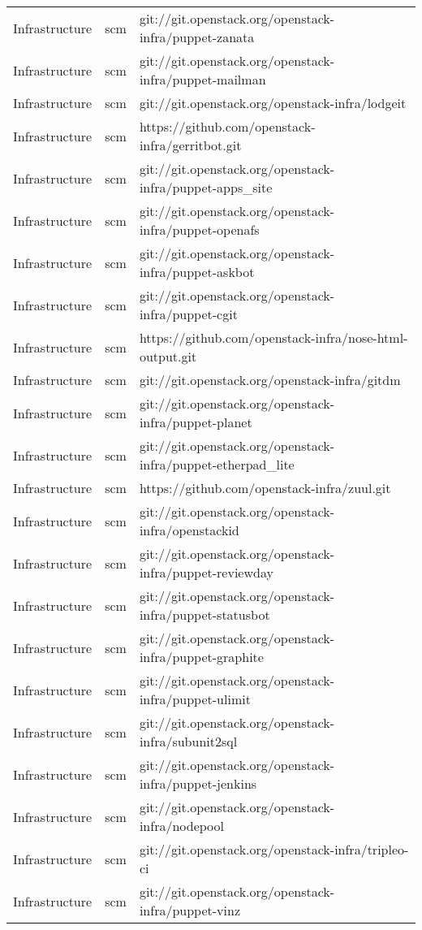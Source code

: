 \begin{center}
\begin{longtable}{|p{4cm}|p{1cm}|p{10cm}|}
Infrastructure&scm&git://git.openstack.org/openstack-infra/puppet-zanata\\ 
Infrastructure&scm&git://git.openstack.org/openstack-infra/puppet-mailman\\ 
Infrastructure&scm&git://git.openstack.org/openstack-infra/lodgeit\\ 
Infrastructure&scm&https://github.com/openstack-infra/gerritbot.git\\ 
Infrastructure&scm&git://git.openstack.org/openstack-infra/puppet-apps\_site\\ 
Infrastructure&scm&git://git.openstack.org/openstack-infra/puppet-openafs\\ 
Infrastructure&scm&git://git.openstack.org/openstack-infra/puppet-askbot\\ 
Infrastructure&scm&git://git.openstack.org/openstack-infra/puppet-cgit\\ 
Infrastructure&scm&https://github.com/openstack-infra/nose-html-output.git\\ 
Infrastructure&scm&git://git.openstack.org/openstack-infra/gitdm\\ 
Infrastructure&scm&git://git.openstack.org/openstack-infra/puppet-planet\\ 
Infrastructure&scm&git://git.openstack.org/openstack-infra/puppet-etherpad\_lite\\ 
Infrastructure&scm&https://github.com/openstack-infra/zuul.git\\ 
Infrastructure&scm&git://git.openstack.org/openstack-infra/openstackid\\ 
Infrastructure&scm&git://git.openstack.org/openstack-infra/puppet-reviewday\\ 
Infrastructure&scm&git://git.openstack.org/openstack-infra/puppet-statusbot\\ 
Infrastructure&scm&git://git.openstack.org/openstack-infra/puppet-graphite\\ 
Infrastructure&scm&git://git.openstack.org/openstack-infra/puppet-ulimit\\ 
Infrastructure&scm&git://git.openstack.org/openstack-infra/subunit2sql\\ 
Infrastructure&scm&git://git.openstack.org/openstack-infra/puppet-jenkins\\ 
Infrastructure&scm&git://git.openstack.org/openstack-infra/nodepool\\ 
Infrastructure&scm&git://git.openstack.org/openstack-infra/tripleo-ci\\ 
Infrastructure&scm&git://git.openstack.org/openstack-infra/puppet-vinz\\ 

\end{longtable}
\end{center}
